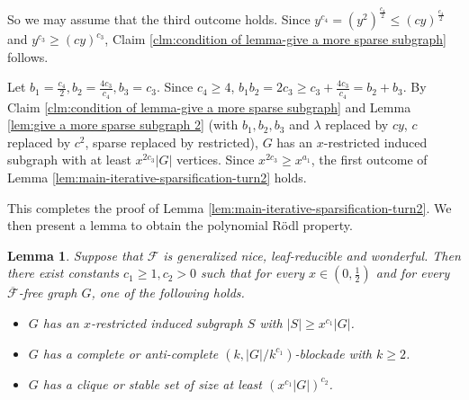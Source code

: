 \documentclass[a4paper,11pt]{article}
\newtheorem{lemma}[theorem]{Lemma}
\let\oldendproof\endproof
\renewenvironment{proof}[1][\proofname]{%
	\oldproof[\normalfont\bfseries #1]%
}{\oldendproof}
\renewcommand{\qedsymbol}{$\square$}%
\newenvironment{subproof}[1][\normalfont\it Subproof]{%
	\renewcommand{\qedsymbol}{{\tiny{$\blacksquare$}}}%
	\begin{proof}[#1]%
	}{%
	\end{proof}%
}
\begin{document}
\begin{proof}
\begin{subproof}[Proof of Claim \ref{clm:condition of lemma-give a more sparse subgraph}]
        So we may assume that the third outcome holds. Since  
        $y^{c_4}=(y^2)^{\frac{c_4}{2}}\leq (cy)^{\frac{c_4}{2}}$
        and $y^{c_3}\ge (cy)^{c_3}$,
        Claim \ref{clm:condition of lemma-give a more sparse subgraph} follows. 
        \end{subproof}

        Let $b_1=\frac{c_4}{2},b_2=\frac{4c_3}{c_4},b_3=c_3$. 
        Since $c_4\geq 4$, $b_1b_2=2c_3\geq c_3+\frac{4c_3}{c_4}=b_2+b_3$.   
        By Claim \ref{clm:condition of lemma-give a more sparse subgraph} and Lemma \ref{lem:give a more sparse subgraph 2} (with $b_1,b_2,b_3$ and $\lambda$ replaced by $cy$, $c$ replaced by $c^2$, sparse replaced by restricted), $G$ has an $x$-restricted induced subgraph with at least $x^{2c_3}|G|$ vertices. 
        Since $x^{2c_3}\geq x^{a_1}$, the first outcome of Lemma \ref{lem:main-iterative-sparsification-turn2} holds. 

        This completes the proof of Lemma \ref{lem:main-iterative-sparsification-turn2}. 
    \end{proof}
    We then present a lemma to obtain the polynomial R\"odl property.  
 
    \begin{lemma}\label{lem:main-rodl-turn2}
        Suppose that $\mathcal{F}$ is generalized nice, leaf-reducible and wonderful. Then
        there exist constants $c_1\geq 1,c_2>0$ such that for every $x\in(0,\frac{1}{2})$ and for every $\overline{\mathcal{F}}$-free graph $G$, one of the following holds. 
        \begin{itemize}
            \item[$(1)$] $G$ has an $x$-restricted induced subgraph $S$ with $|S|\geq x^{c_1}|G|$. 
            
            \item[$(2)$] $G$ has a complete or anti-complete $(k,|G|/k^{c_1})$-blockade with $k\geq 2$.
            
            \item[$(3)$] $G$ has a clique or stable set of size at least $(x^{c_1}|G|)^{c_2}$.
        \end{itemize}
    \end{lemma}
    
\end{document}
